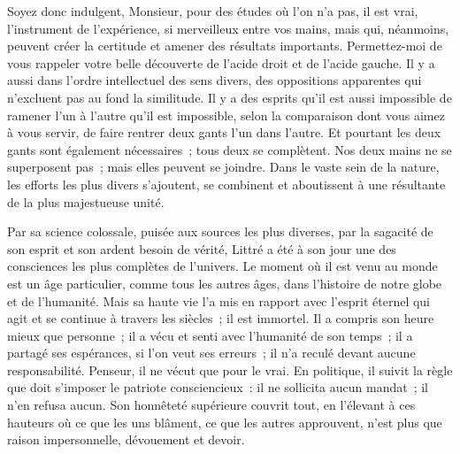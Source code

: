 \documentclass[french,twoside]{book} %
\newcommand\persName[1]{#1}
\begin{document}
Soyez donc indulgent, Monsieur, pour des études où l’on n’a pas, il est vrai, l’instrument de l’expérience, si merveilleux entre vos mains, mais qui, néanmoins, peuvent créer la certitude et amener des résultats importants. Permettez-moi de vous rappeler votre belle découverte de l’acide droit et de l’acide gauche. Il y a aussi dans l’ordre intellectuel des sens divers, des oppositions apparentes qui n’excluent pas au fond la similitude. Il y a des esprits qu’il est aussi impossible de ramener l’un à l’autre qu’il est impossible, selon la comparaison dont vous aimez à vous servir, de faire rentrer deux gants l’un dans l’autre. Et pourtant les deux gants sont également nécessaires ; tous deux se complètent. Nos deux mains ne se superposent pas ; mais elles peuvent se joindre. Dans le vaste sein de la nature, les efforts les plus divers s’ajoutent, se combinent et aboutissent à une résultante de la plus majestueuse unité.\par
Par sa science colossale, puisée aux sources les plus diverses, par la sagacité de son esprit et son ardent besoin de vérité, {\persName Littré} a été à son jour une des consciences les plus complètes de l’univers. Le moment où il est venu au monde est un âge particulier, comme tous les autres âges, dans l’histoire de notre globe et de l’humanité. Mais sa haute vie l’a mis en rapport avec l’esprit éternel qui agit et se continue à travers les siècles ; il est immortel. Il a compris son heure mieux que personne ; il a vécu et senti avec l’humanité de son temps ; il a partagé ses espérances, si l’on veut ses erreurs ; il n’a reculé devant aucune responsabilité. Penseur, il ne vécut que pour le vrai. En politique, il suivit la règle que doit s’imposer le patriote consciencieux : il ne sollicita aucun mandat ; il n’en refusa aucun. Son honnêteté supérieure couvrit tout, en l’élevant à ces hauteurs où ce que les uns blâment, ce que les autres approuvent, n’est plus que raison impersonnelle, dévouement et devoir.\par
\end{document}
